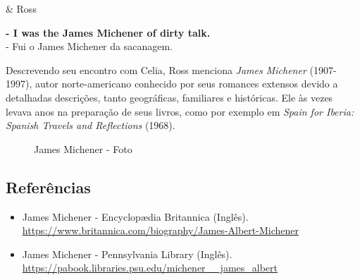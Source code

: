 \begin{tcolorbox}[enhanced,center upper,
    drop fuzzy shadow southeast, boxrule=0.3pt,
    lower separated=false, breakable,
    colframe=black!30!dialogoBorder,colback=white]
\medskip
\begin{minipage}[c]{0.16\linewidth}
   & \centering \scriptsize{Ross}
\end{minipage}
\hfill
\begin{minipage}[c]{0.8\linewidth}
  \textbf{- I was the James Michener of dirty talk.}\\
  - Fui o James Michener da sacanagem.
\end{minipage}
\end{tcolorbox}

Descrevendo seu encontro com Celia, Ross menciona \emph{James Michener}
(1907-1997), autor norte-americano conhecido por seus romances extensos
devido a detalhadas descrições, tanto geográficas, familiares e
históricas. Ele às vezes levava anos na preparação de seus livros, como
por exemplo em \emph{Spain for Iberia: Spanish Travels and Reflections}
(1968).

\begin{figure}
  \centering
    \caption{James Michener - Foto\label{fig:james-michener-foto}}
\end{figure}

\hypertarget{referuxeancias-5}{%
\subsection{Referências}\label{referuxeancias-5}}

\begin{itemize}
\tightlist
\item
  \sloppy James Michener - Encyclopædia Britannica (Inglês). \url{https://www.britannica.com/biography/James-Albert-Michener}
\item
  \sloppy James Michener - Pennsylvania Library (Inglês). \url{https://pabook.libraries.psu.edu/michener__james_albert}
\end{itemize}
